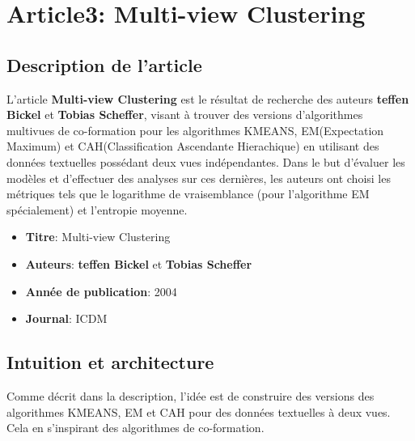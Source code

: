 \documentclass[12pt, french, latin.medieval, a4paper]{report}
\begin{document}
	\section{Article3: Multi-view Clustering}
    	\subsection{Description de l'article}
        	L'article \textbf{Multi-view Clustering} \cite{bickel2004multi} est le résultat de recherche des auteurs \textbf{teffen Bickel} et \textbf{Tobias Scheffer}, visant à trouver des versions d'algorithmes multivues de co-formation pour les algorithmes KMEANS, EM(Expectation Maximum) et CAH(Classification Ascendante Hierachique) en utilisant des données textuelles possédant deux vues indépendantes.
        	Dans le but d'évaluer les modèles et d'effectuer des analyses sur ces dernières, les auteurs ont choisi les métriques tels que le logarithme de vraisemblance (pour l’algorithme EM spécialement) et l'entropie moyenne.
   	 
       	\begin{itemize}
           	\item \textbf{Titre}: Multi-view Clustering
           	\item \textbf{Auteurs}: \textbf{teffen Bickel} et \textbf{Tobias Scheffer}
           	\item \textbf{Année de publication}: 2004
           	\item \textbf{Journal}: ICDM
       	\end{itemize}
   	 
   	\subsection{Intuition et architecture}
        	Comme décrit dans la description, l'idée est de construire des versions des algorithmes KMEANS, EM et CAH pour des données textuelles à deux vues.
        	Cela en s'inspirant des algorithmes de co-formation.
\end{document}

